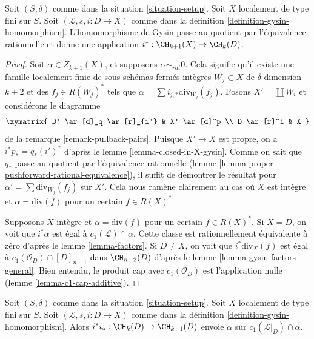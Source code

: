 \begin{lemma}
\label{lemma-gysin-factors}
Soit $(S, \delta)$ comme dans la situation \ref{situation-setup}.
Soit $X$ localement de type fini sur $S$.
Soit $(\mathcal{L}, s, i : D \to X)$ comme dans la
définition \ref{definition-gysin-homomorphism}.
L'homomorphisme de Gysin passe au quotient par l'équivalence rationnelle et
donne une application $i^* : \CH_{k + 1}(X) \to \CH_k(D)$.
\end{lemma}

\begin{proof}
Soit $\alpha \in Z_{k + 1}(X)$, et supposons $\alpha \sim_{rat} 0$.
Cela signifie qu'il existe une famille localement finie de sous-schémas
fermés intègres $W_j \subset X$ de $\delta$-dimension $k + 2$
et des $f_j \in R(W_j)^*$ tels que
$\alpha = \sum i_{j, *}\text{div}_{W_j}(f_j)$.
Posons $X' = \coprod W_i$ et considérons le diagramme
$$
\xymatrix{
D' \ar[d]_q \ar[r]_{i'} & X' \ar[d]^p \\
D \ar[r]^i & X
}
$$
de la remarque \ref{remark-pullback-pairs}. Puisque $X' \to X$ est propre,
on a $i^*p_* = q_*(i')^*$ d'après le lemme \ref{lemma-closed-in-X-gysin}.
Comme on sait que $q_*$ passe au quotient par l'équivalence rationnelle
(lemme \ref{lemma-proper-pushforward-rational-equivalence}), il suffit
de démontrer le résultat pour $\alpha' = \sum \text{div}_{W_j}(f_j)$
sur $X'$. Cela nous ramène clairement au cas où $X$ est intègre
et $\alpha = \text{div}(f)$ pour un certain $f \in R(X)^*$.

\medskip\noindent
Supposons $X$ intègre et $\alpha = \text{div}(f)$ pour un certain $f \in R(X)^*$.
Si $X = D$, on voit que $i^*\alpha$ est égal
à $c_1(\mathcal{L}) \cap \alpha$.
Cette classe est rationnellement équivalente à zéro d'après le lemme \ref{lemma-factors}.
Si $D \not = X$, on voit que $i^*\text{div}_X(f)$ est égal à
$c_1(\mathcal{O}_D) \cap [D]_{n - 1}$ dans $\CH_{n - 2}(D)$ d'après le
lemme \ref{lemma-gysin-factors-general}. Bien entendu,
le produit cap avec $c_1(\mathcal{O}_D)$ est l'application nulle
(lemme \ref{lemma-c1-cap-additive}).
\end{proof}

\begin{lemma}
\label{lemma-gysin-back}
Soit $(S, \delta)$ comme dans la situation \ref{situation-setup}. Soit $X$ localement
de type fini sur $S$. Soit $(\mathcal{L}, s, i : D \to X)$ comme dans la
définition \ref{definition-gysin-homomorphism}. Alors
$i^*i_* : \CH_k(D) \to \CH_{k - 1}(D)$ envoie $\alpha$ sur
$c_1(\mathcal{L}|_D) \cap \alpha$.
\end{lemma}

